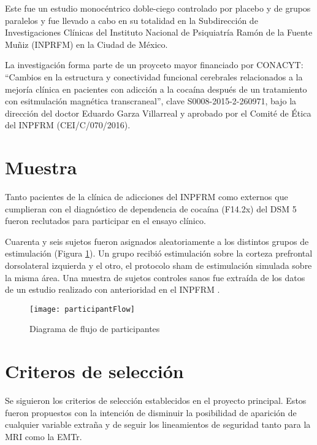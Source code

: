 Este fue un estudio monocéntrico doble-ciego controlado por placebo y de grupos paralelos y fue llevado a cabo en su totalidad en la Subdirección de Investigaciones Clínicas del Instituto Nacional de Psiquiatría Ramón de la Fuente Muñiz (INPRFM) en la Ciudad de México.\par
La investigación forma parte de un proyceto mayor financiado por CONACYT:
``Cambios en la estructura y conectividad funcional cerebrales relacionados a la mejoría clínica en pacientes con adicción a la cocaína después de un tratamiento con esitmulación magnética transcraneal'',
clave S0008-2015-2-260971, bajo la dirección del doctor Eduardo Garza Villarreal y aprobado por el Comité de Ética del INPFRM (CEI/C/070/2016).

\section{Muestra}
Tanto pacientes de la clínica de adicciones del INPFRM como externos que cumplieran con el diagnóstico de dependencia de cocaína (F14.2x) del DSM 5 \parencite{APA2013} fueron reclutados para participar en el ensayo clínico.\par
Cuarenta y seis sujetos fueron asignados aleatoriamente a los distintos grupos de estimulación (Figura \ref{fig:flow}).
Un grupo recibió estimulación sobre la corteza prefrontal dorsolateral izquierda y el otro, el protocolo sham de estimulación simulada sobre la misma área.
Una muestra de sujetos controles sanos fue extraída de los datos de un estudio realizado con anterioridad en el INPFRM \parencite{Garza2017}.

\begin{figure}[H]
    \centering
    \texttt{[image: participantFlow]}
    \caption{Diagrama de flujo de participantes}
    \label{fig:flow}
\end{figure}

\section{Criteros de selección}
Se siguieron los criterios de selección establecidos en el proyecto principal.
Estos fueron propuestos con la intención de disminuir la posibilidad de aparición de cualquier variable extraña y de seguir los lineamientos de seguridad tanto para la MRI como la EMTr.

